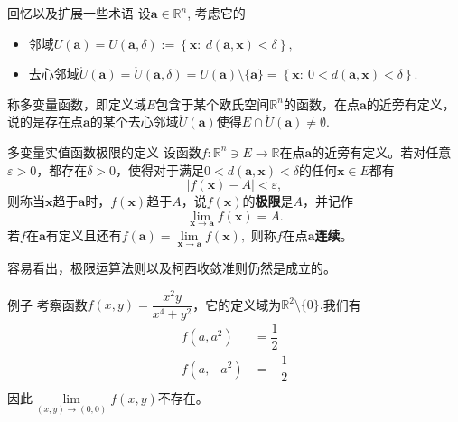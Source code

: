 
\begin{frame}

\begin{block}{回忆以及扩展一些术语}
设$\mathbf{a}\in\mathbb{R}^n$, 考虑它的
\begin{itemize}
\item 邻域$U(\mathbf{a}) = U(\mathbf{a},\delta) := \left\{ \mathbf{x}: \ d(\mathbf{a}, \mathbf{x}) < \delta \right\},$
\item 去心邻域$\mathring{U}(\mathbf{a}) = \mathring{U}(\mathbf{a},\delta) = U(\mathbf{a})\setminus \{\mathbf{a}\} = \left\{ \mathbf{x}: \ 0 < d(\mathbf{a}, \mathbf{x}) < \delta \right\}.$
\end{itemize}

\vspace{2em}
\pause

称多变量函数，即定义域$E$包含于某个欧氏空间$\mathbb{R}^n$的函数，在点$\mathbf{a}$的近旁有定义，说的是存在点$\mathbf{a}$的某个去心邻域$\mathring{U}(\mathbf{a})$使得$E\cap \mathring{U}(\mathbf{a}) \neq \emptyset.$
\end{block}

\end{frame}


\begin{frame}

\begin{block}{多变量实值函数极限的定义}
设函数$f: \mathbb{R}^n \ni E \to \mathbb{R}$在点$\mathbf{a}$的近旁有定义。若对任意$\varepsilon > 0$，都存在$\delta > 0$，使得对于满足$0 < d(\mathbf{a}, \mathbf{x}) < \delta$的任何$\mathbf{x}\in E$都有
$$|f(\mathbf{x})-A| < \varepsilon,$$
则称当$\mathbf{x}$趋于$\mathbf{a}$时，$f(\mathbf{x})$趋于$A$，说$f(\mathbf{x})$的{\bfseries 极限}是$A$，并记作
$$\lim\limits_{\mathbf{x}\to \mathbf{a}}f(\mathbf{x}) = A.$$
若$f$在$\mathbf{a}$有定义且还有$f(\mathbf{a}) = \lim\limits_{\mathbf{x}\to \mathbf{a}}f(\mathbf{x}),$ 则称$f$在点$\mathbf{a}${\bfseries 连续}。
\end{block}

\pause

容易看出，极限运算法则以及柯西收敛准则仍然是成立的。

\end{frame}


\begin{frame}

\begin{block}{例子}
考察函数\(\displaystyle f(x,y) = \dfrac{x^2y}{x^4+y^2}\)，它的定义域为$\mathbb{R}^2\setminus\{0\}.$我们有
\begin{align*}
f(a,a^2) & = \dfrac{1}{2} \\
f(a,-a^2) & = -\dfrac{1}{2} \\
\end{align*}
因此$\lim\limits_{(x,y)\to(0,0)} f(x,y)$不存在。
\end{block}


\end{frame}

